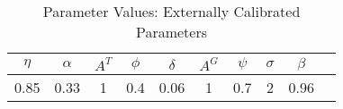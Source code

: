 \begin{table}[H] 
\singlespace 
\center 
\caption{Parameter Values: Externally Calibrated Parameters} \label{tab:direct}
\vspace{-.1in} 
\begin{tabular}{c c c c c c c c c c}\hline 
\hline 
  	$\eta$ & $\alpha$ & $A^T$ & $\phi$ &  $\delta$ & $A^G$ & $\psi$ & $\sigma$ & $\beta$   \\ 
\hline 
     0.85 &     0.33 &        1 &      0.4 &     0.06 &        1 &      0.7 &        2 &     0.96     \\  \hline 
\end{tabular}
\end{table} 
